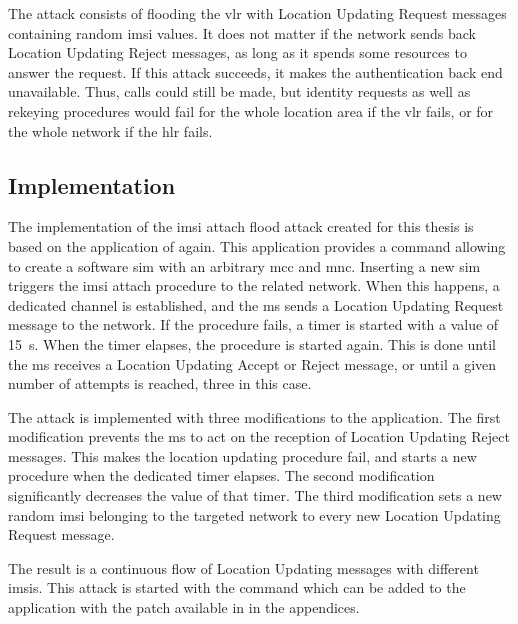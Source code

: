       The attack consists of flooding the \gls{vlr} with Location
      Updating Request messages containing random \gls{imsi} values. It
      does not matter if the network sends back Location Updating Reject
      messages, as long as it spends some resources to answer the
      request. If this attack succeeds, it makes the authentication back
      end unavailable. Thus, calls could still be made, but identity
      requests as well as rekeying procedures would fail for the whole
      location area if the \gls{vlr} fails, or for the whole network if
      the \gls{hlr} fails.

      \subsection{Implementation}

      The implementation of the \gls{imsi} attach flood attack created
      for this thesis is based on the  application of
       again. This application provides a  command allowing to create a software \gls{sim} with an
      arbitrary \gls{mcc} and \gls{mnc}. Inserting a new \gls{sim}
      triggers the \gls{imsi} attach procedure to the related network.
      When this happens, a dedicated channel is established, and the
      \gls{ms} sends a Location Updating Request message to the network.
      If the procedure fails, a timer is started with a value of
      \SI{15}{\second}. When the timer elapses, the procedure is started
      again. This is done until the \gls{ms} receives a Location
      Updating Accept or Reject message, or until a given number of
      attempts is reached, three in this case.

      The attack is implemented with three modifications to the
       application. The first modification prevents the
      \gls{ms} to act on the reception of Location Updating Reject
      messages. This makes the location updating procedure fail, and
      starts a new procedure when the dedicated timer elapses. The
      second modification significantly decreases the value of that
      timer. The third modification sets a new random \gls{imsi}
      belonging to the targeted network to every new Location Updating
      Request message.

      The result is a continuous flow of Location Updating messages with
      different \glspl{imsi}. This attack is started with the  command which can be added to the 
      application with the patch available in  in the
      appendices.

